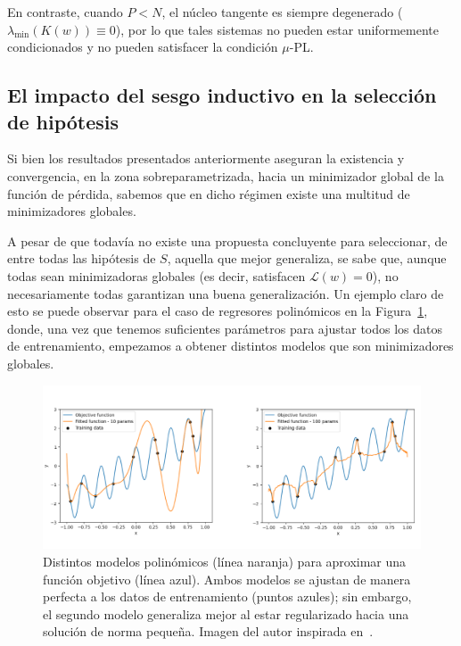 En contraste, cuando $P < N$, el núcleo tangente es siempre degenerado ($\lambda_{\min}(K(w)) \equiv 0$), por lo que tales sistemas no pueden estar uniformemente condicionados y no pueden satisfacer la condición $\mu$-PL.\newline

\subsection{El impacto del sesgo inductivo en la selección de hipótesis}\label{subsec:suavidad-funcional}

Si bien los resultados presentados anteriormente aseguran la existencia y convergencia, en la zona sobreparametrizada, hacia un minimizador global de la función de pérdida, sabemos que en dicho régimen existe una multitud de minimizadores globales.\newline  

A pesar de que todavía no existe una propuesta concluyente para seleccionar, de entre todas las hipótesis de $S$, aquella que mejor generaliza, se sabe que, aunque todas sean minimizadoras globales (es decir, satisfacen $\mathcal{L}(w) = 0$), no necesariamente todas garantizan una buena generalización. Un ejemplo claro de esto se puede observar para el caso de regresores polinómicos en la Figura~\ref{fig:suavidad1}, donde, una vez que tenemos suficientes parámetros para ajustar todos los datos de entrenamiento, empezamos a obtener distintos modelos que son minimizadores globales.\newline

\begin{figure}[h]
    \centering
    \includegraphics[width=0.8\linewidth]{img/suavidad1.png}
    \caption[Distintos modelos polinómicos para aproximar una función.]{Distintos modelos polinómicos (línea naranja) para aproximar una función objetivo (línea azul). Ambos modelos se ajustan de manera perfecta a los datos de entrenamiento (puntos azules); sin embargo, el segundo modelo generaliza mejor al estar regularizado hacia una solución de norma pequeña. Imagen del autor inspirada en~\cite{Schaeffer2023}.}\label{fig:suavidad1}
\end{figure}

